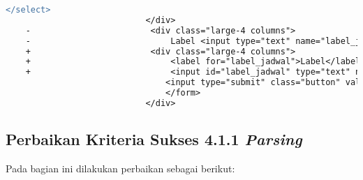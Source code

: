 \begin{lstlisting}[frame=single, label={lst:perbaikan_3.3.2_label_masukan}, language=diff, caption=Perbaikan Kriteria Sukses 3.3.2 - Tidak Terdapat Label pada Kolom Masukan]
                                </select>
                            </div>
    -                        <div class="large-4 columns">
    -                            Label <input type="text" name="label_jadwal"><br>
    +                        <div class="large-4 columns">   
    +                            <label for="label_jadwal">Label</label>
    +                            <input id="label_jadwal" type="text" name="label_jadwal"><br>
                                <input type="submit" class="button" value="Tambah">
                                </form>
                            </div>
\end{lstlisting} 

\subsection{Perbaikan Kriteria Sukses 4.1.1 \textit{Parsing}}
\label{subsec:perbaikan_kriteria_sukses_4.1.1}
Pada bagian ini dilakukan perbaikan sebagai berikut:

